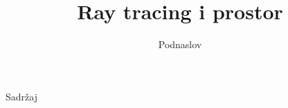 \documentclass[9pt]{beamer}
\title{Ray tracing i prostor}
\subtitle{Podnaslov}
\institute{Računalna grafika}
\begin{document}
\begin{frame}
 \titlepage
\end{frame}

\begin{frame}{Sadržaj}
  \tableofcontents
\end{frame}

%
%
\end{document}
